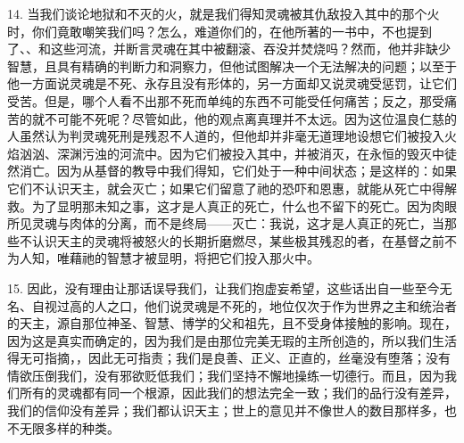 14. 当我们谈论地狱和不灭的火，就是我们得知灵魂被其仇敌投入其中的那个火时，你们竟敢嘲笑我们吗？怎么，难道你们的，在他所著的一书中，不也提到了、、和这些河流，并断言灵魂在其中被翻滚、吞没并焚烧吗？然而，他并非缺少智慧，且具有精确的判断力和洞察力，但他试图解决一个无法解决的问题；以至于他一方面说灵魂是不死、永存且没有形体的，另一方面却又说灵魂受惩罚，让它们受苦。但是，哪个人看不出那不死而单纯的东西不可能受任何痛苦；反之，那受痛苦的就不可能不死呢？尽管如此，他的观点离真理并不太远。因为这位温良仁慈的人虽然认为判灵魂死刑是残忍不人道的，但他却并非毫无道理地设想它们被投入火焰汹汹、深渊污浊的河流中。因为它们被投入其中，并被消灭，在永恒的毁灭中徒然消亡。因为从基督的教导中我们得知，它们处于一种中间状态；是这样的：如果它们不认识天主，就会灭亡；如果它们留意了祂的恐吓和恩惠，就能从死亡中得解救。为了显明那未知之事，这才是人真正的死亡，什么也不留下的死亡。因为肉眼所见灵魂与肉体的分离，而不是终局——灭亡：我说，这才是人真正的死亡，当那些不认识天主的灵魂将被怒火的长期折磨燃尽，某些极其残忍的者，在基督之前不为人知，唯藉祂的智慧才被显明，将把它们投入那火中。\par

15. 因此，没有理由让那话误导我们，让我们抱虚妄希望，这些话出自一些至今无名、自视过高的人之口，他们说灵魂是不死的，地位仅次于作为世界之主和统治者的天主，源自那位神圣、智慧、博学的父和祖先，且不受身体接触的影响。现在，因为这是真实而确定的，因为我们是由那位完美无瑕的主所创造的，所以我们生活得无可指摘，，因此无可指责；我们是良善、正义、正直的，丝毫没有堕落；没有情欲压倒我们，没有邪欲贬低我们；我们坚持不懈地操练一切德行。而且，因为我们所有的灵魂都有同一个根源，因此我们的想法完全一致；我们的品行没有差异，我们的信仰没有差异；我们都认识天主；世上的意见并不像世人的数目那样多，也不无限多样的种类。\par

